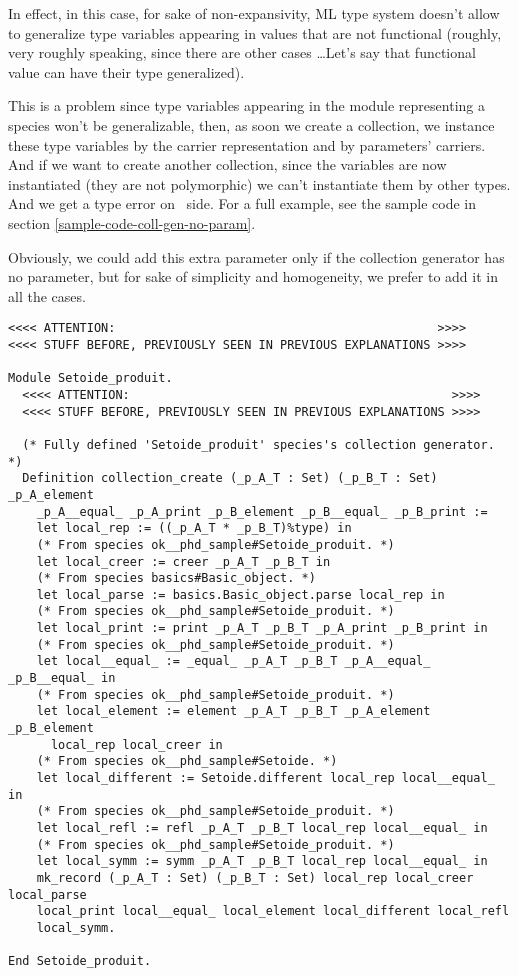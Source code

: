 In effect, in this case, for sake of non-expansivity, ML type system
doesn't allow to generalize type variables appearing in values that
are not functional (roughly, very roughly speaking, since there are
other cases \ldots Let's say that functional value can have their
type generalized).

This is a problem since type variables appearing in the module
representing a species won't be generalizable, then, as soon we create
a collection, we instance these type variables by the carrier
representation and by parameters' carriers. And if we want to create
another collection, since the variables are now instantiated (they are
not polymorphic) we can't instantiate them by other types. And we get
a type error on \ocaml\ side. For a full example, see the sample code
in section \ref{sample-code-coll-gen-no-param}.

Obviously, we could add this extra parameter only if the collection
generator has no parameter, but for sake of simplicity and
homogeneity, we prefer to add it in all the cases.


{\footnotesize
\begin{lstlisting}[language=MyCoq]
<<<< ATTENTION:                                             >>>>
<<<< STUFF BEFORE, PREVIOUSLY SEEN IN PREVIOUS EXPLANATIONS >>>>

Module Setoide_produit.
  <<<< ATTENTION:                                             >>>>
  <<<< STUFF BEFORE, PREVIOUSLY SEEN IN PREVIOUS EXPLANATIONS >>>>

  (* Fully defined 'Setoide_produit' species's collection generator. *)
  Definition collection_create (_p_A_T : Set) (_p_B_T : Set) _p_A_element
    _p_A__equal_ _p_A_print _p_B_element _p_B__equal_ _p_B_print :=
    let local_rep := ((_p_A_T * _p_B_T)%type) in
    (* From species ok__phd_sample#Setoide_produit. *)
    let local_creer := creer _p_A_T _p_B_T in
    (* From species basics#Basic_object. *)
    let local_parse := basics.Basic_object.parse local_rep in
    (* From species ok__phd_sample#Setoide_produit. *)
    let local_print := print _p_A_T _p_B_T _p_A_print _p_B_print in
    (* From species ok__phd_sample#Setoide_produit. *)
    let local__equal_ := _equal_ _p_A_T _p_B_T _p_A__equal_ _p_B__equal_ in
    (* From species ok__phd_sample#Setoide_produit. *)
    let local_element := element _p_A_T _p_B_T _p_A_element _p_B_element
      local_rep local_creer in
    (* From species ok__phd_sample#Setoide. *)
    let local_different := Setoide.different local_rep local__equal_ in
    (* From species ok__phd_sample#Setoide_produit. *)
    let local_refl := refl _p_A_T _p_B_T local_rep local__equal_ in
    (* From species ok__phd_sample#Setoide_produit. *)
    let local_symm := symm _p_A_T _p_B_T local_rep local__equal_ in
    mk_record (_p_A_T : Set) (_p_B_T : Set) local_rep local_creer local_parse
    local_print local__equal_ local_element local_different local_refl
    local_symm.
  
End Setoide_produit.
\end{lstlisting}}

